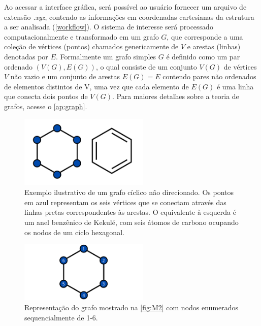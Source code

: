 Ao acessar a interface gráfica, será possível ao usuário fornecer um arquivo de extensão \textit{.xyz}, contendo as informações em coordenadas cartesianas da estrutura a ser analisada (\autoref{workflow}). O sistema de interesse será processado computacionalmente e transformado em um grafo $G$, que corresponde a uma coleção de vértices (pontos) chamados genericamente de $V$ e arestas (linhas) denotadas por $E$. Formalmente um grafo simples $G$ é definido como um par ordenado $(V(G), E(G))$, o qual consiste de um conjunto $V(G)$ de vértices $V$ não vazio e um conjunto de arestas $E(G) = E$ contendo pares não ordenados de elementos distintos de V, uma vez que cada elemento de $E(G)$ é uma linha que conecta dois pontos de $V(G)$. Para maiores detalhes sobre a teoria de grafos, acesse o \autoref{ap:graph}.

\begin{figure}[htb]
	\caption{\label{fig:M2} Exemplo ilustrativo de um grafo cíclico não direcionado. Os pontos em azul representam os seis vértices que se conectam através das linhas pretas correspondentes às arestas. O equivalente à esquerda é um anel benzênico de Kekulé, com seis átomos de carbono ocupando os nodos de um ciclo hexagonal.}
	\begin{center}
		\includegraphics[width=0.55\textwidth]{images/grafo(2).png}
	\end{center}
\end{figure}

\begin{figure}[htb]
\caption{\label{fig:graphEnumerated}Representação do grafo mostrado na \autoref{fig:M2} com nodos enumerados sequencialmente de 1-6.}
	\begin{center}
		\includegraphics[width=0.55\textwidth]{images/graphEnumerated.png}
	\end{center}
\end{figure}

